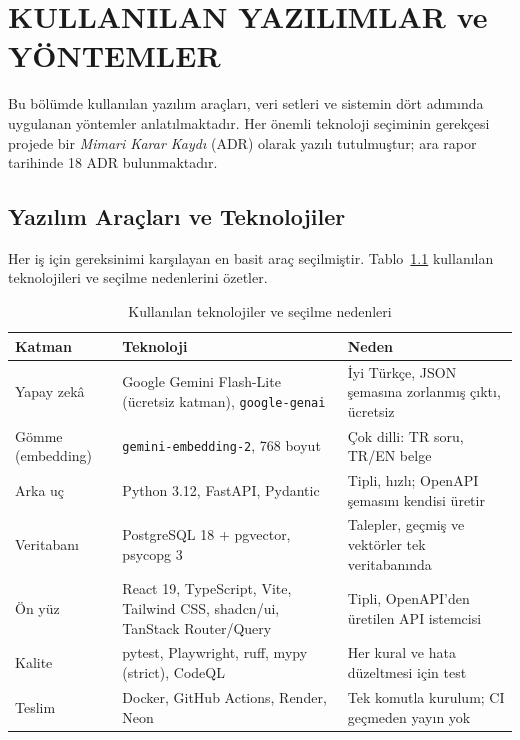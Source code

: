 \chapter{KULLANILAN YAZILIMLAR ve YÖNTEMLER}
\label{ch:yontem}

Bu bölümde kullanılan yazılım araçları, veri setleri ve sistemin dört adımında uygulanan yöntemler
anlatılmaktadır. Her önemli teknoloji seçiminin gerekçesi projede bir \textit{Mimari Karar Kaydı}
(ADR) olarak yazılı tutulmuştur; ara rapor tarihinde 18 ADR bulunmaktadır.

\section{Yazılım Araçları ve Teknolojiler}

Her iş için gereksinimi karşılayan en basit araç seçilmiştir. Tablo~\ref{tab:teknoloji} kullanılan
teknolojileri ve seçilme nedenlerini özetler.

\begin{table}[!ht]
\centering
\caption{Kullanılan teknolojiler ve seçilme nedenleri}
\label{tab:teknoloji}
\footnotesize
\renewcommand{\arraystretch}{1.2}
\begin{tabularx}{\textwidth}{@{}p{2.4cm} p{4.2cm} X@{}}
\toprule
\textbf{Katman} & \textbf{Teknoloji} & \textbf{Neden} \\
\midrule
Yapay zekâ & Google Gemini Flash-Lite (ücretsiz katman), \texttt{google-genai} & İyi Türkçe, JSON şemasına zorlanmış çıktı, ücretsiz \\
Gömme (embedding) & \texttt{gemini-embedding-2}, 768 boyut & Çok dilli: TR soru, TR/EN belge \\
Arka uç & Python 3.12, FastAPI, Pydantic & Tipli, hızlı; OpenAPI şemasını kendisi üretir \\
Veritabanı & PostgreSQL 18 + pgvector, psycopg 3 & Talepler, geçmiş ve vektörler tek veritabanında \\
Ön yüz & React 19, TypeScript, Vite, Tailwind CSS, shadcn/ui, TanStack Router/Query & Tipli, OpenAPI'den üretilen API istemcisi \\
Kalite & pytest, Playwright, ruff, mypy (strict), CodeQL & Her kural ve hata düzeltmesi için test \\
Teslim & Docker, GitHub Actions, Render, Neon & Tek komutla kurulum; CI geçmeden yayın yok \\
\bottomrule
\end{tabularx}
\end{table}

